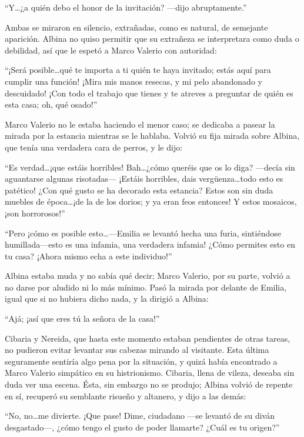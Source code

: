 \documentclass[11pt,openany]{book}
\begin{document}
“Y\dots ¿a quién debo el honor de la invitación? —dijo abruptamente.” 

Ambas se miraron en silencio, extrañadas, como es natural, de semejante aparición. Albina no quiso permitir que su extrañeza se interpretara como duda o debilidad, así que le espetó a Marco Valerio con autoridad: 

“¡Será posible\dots qué te importa a ti quién te haya invitado; estás aquí para cumplir una función! ¡Mira mis manos resecas, y mi pelo abandonado y descuidado! ¡Con todo el trabajo que tienes y te atreves a preguntar de quién es esta casa; oh, qué osado!” 

Marco Valerio no le estaba haciendo el menor caso; se dedicaba a pasear la mirada por la estancia mientras se le hablaba. Volvió su fija mirada sobre Albina, que tenía una verdadera cara de perros, y le dijo: 

“Es verdad\dots ¡que estáis horribles! Bah\dots ¿cómo queréis que os lo diga? —decía sin aguantarse algunas risotadas— ¡Estáis horribles, dais vergüenza\dots todo esto es patético! ¿Con qué gusto se ha decorado esta estancia? Estos son sin duda muebles de época\dots ¡de la de los dorios; y ya eran feos entonces! Y estos mosaicos, ¡son horrorosos!”

“Pero ¡cómo es posible esto\dots—Emilia se levantó hecha una furia, sintiéndose humillada—esto es una infamia, una verdadera infamia! ¿Cómo permites esto en tu casa? ¡Ahora mismo echa a este individuo!” 

Albina estaba muda y no sabía qué decir; Marco Valerio, por su parte, volvió a no darse por aludido ni lo más mínimo. Pasó la mirada por delante de Emilia, igual que si no hubiera dicho nada, y la dirigió a Albina: 

“Ajá; ¡así que eres tú la señora de la casa!” 

Cibaria y Nereida, que hasta este momento estaban pendientes de otras tareas, no pudieron evitar levantar sus cabezas mirando al visitante. Esta última seguramente sentiría algo pena por la situación, y quizá había encontrado a Marco Valerio simpático en su histrionismo. Cibaria, llena de vileza, deseaba sin duda ver una escena. Ésta, sin embargo no se produjo; Albina volvió de repente en sí, recuperó su semblante risueño y altanero, y dijo a las demás:

``No, no\dots me divierte. ¡Que pase! Dime, ciudadano —se levantó de su diván desgastado—, ¿cómo tengo el gusto de poder llamarte? ¿Cuál es tu origen?''
\end{document}
